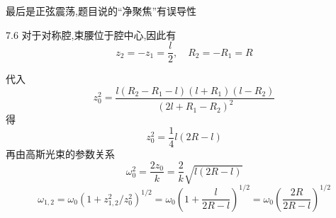 


最后是正弦震荡,题目说的“净聚焦”有误导性


7.6
对于对称腔,束腰位于腔中心,因此有
$$
z_2=-z_1=\frac{l}{2}, \quad R_2=-R_1=R
$$

代入
$$
z_0^2=\frac{l(R_2-R_1-l)(l+R_1)(l-R_2)}{(2l+R_1-R_2)^2}
$$
得
$$
z_0^2=\frac{1}{4}l(2R-l)
$$
再由高斯光束的参数关系
$$
\omega_0^2=\frac{2z_0}{k}=\frac{2}{k}\sqrt{l(2R-l)}
$$
$$
\omega_{1,2}
=\omega_0\left(1+z_{1,2}^2/z_0^2\right)^{1/2}
=\omega_0\left(1+\frac{l}{2R-l}\right)^{1/2}
=\omega_0\left(\frac{2R}{2R-l}\right)^{1/2}
$$


